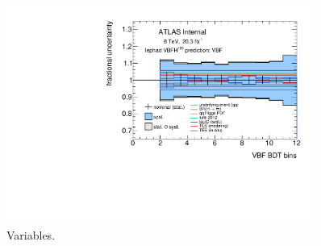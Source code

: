 \begin{figure}[tp]
  \includegraphics[width=0.90\textwidth]{figures/uncertainties/uncertainties_lephad_paper14_8TeV_VBFH125_other_VBF}
  \caption{Variables.}
  \label{fig:backgrounds-uncertainties-vbfother}
\end{figure}

